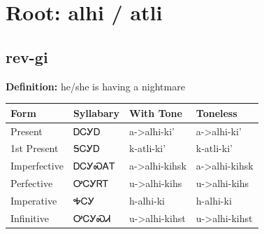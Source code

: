 \documentclass{article}%
\begin{document}
%
\normalsize%
\section*{Root: alhi / atli}%
\subsection*{rev-gi}%
\textbf{Definition: }%
he/she is having a nightmare%
\\[0.5em]%
\begin{tabular}{|l|l|l|l|}%
\hline%
\textbf{Form}&\textbf{Syllabary}&\textbf{With Tone}&\textbf{Toneless}\\%
\hline%
Present&ᎠᏟᎩᎠ&a{-}>alhi{-}ki'&a{-}>alhi{-}ki'\\%
1st Present&ᎦᏟᎩᎠ&k{-}atli{-}ki'&k{-}atli{-}ki'\\%
Imperfective&ᎠᏟᎩᏍᎪᎢ&a{-}>alhi{-}kihsk&a{-}>alhi{-}kihsk\\%
Perfective&ᎤᏟᎩᏒᎢ&u{-}>alhi{-}kihs&u{-}>alhi{-}kihs\\%
Imperative&ᎭᏟᎩ&h{-}alhi{-}ki&h{-}alhi{-}ki\\%
Infinitive&ᎤᏟᎩᏍᏗ&u{-}>alhi{-}kihst&u{-}>alhi{-}kihst\\%
\hline%
\end{tabular}%
\\[1em]%
\end{document}
